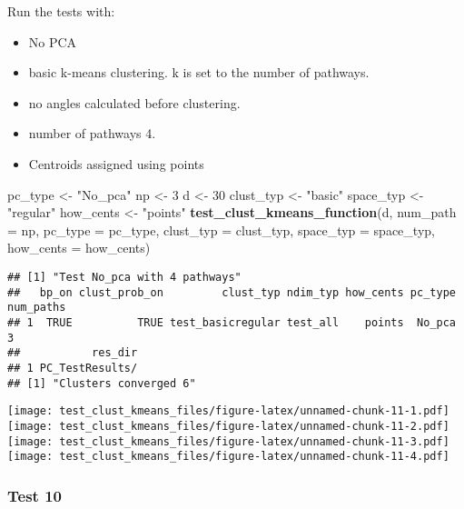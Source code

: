 \documentclass[
]{article}
\newenvironment{Shaded}{\begin{snugshade}}{\end{snugshade}}
\newcommand{\AttributeTok}[1]{\textcolor[rgb]{0.13,0.29,0.53}{#1}}
\newcommand{\DecValTok}[1]{\textcolor[rgb]{0.00,0.00,0.81}{#1}}
\newcommand{\FunctionTok}[1]{\textcolor[rgb]{0.13,0.29,0.53}{\textbf{#1}}}
\newcommand{\NormalTok}[1]{#1}
\newcommand{\OtherTok}[1]{\textcolor[rgb]{0.56,0.35,0.01}{#1}}
\newcommand{\StringTok}[1]{\textcolor[rgb]{0.31,0.60,0.02}{#1}}
\providecommand{\tightlist}{%
  \setlength{\itemsep}{0pt}\setlength{\parskip}{0pt}}
\begin{document}
Run the tests with:

\begin{itemize}
\tightlist
\item
  No PCA
\item
  basic k-means clustering. k is set to the number of pathways.
\item
  no angles calculated before clustering.
\item
  number of pathways 4.
\item
  Centroids assigned using points
\end{itemize}

\begin{Shaded}
\begin{Highlighting}[]
\NormalTok{pc\_type }\OtherTok{\textless{}{-}} \StringTok{"No\_pca"}
\NormalTok{np }\OtherTok{\textless{}{-}} \DecValTok{3}
\NormalTok{d }\OtherTok{\textless{}{-}} \DecValTok{30}
\NormalTok{clust\_typ }\OtherTok{\textless{}{-}} \StringTok{"basic"}
\NormalTok{space\_typ }\OtherTok{\textless{}{-}} \StringTok{"regular"}
\NormalTok{how\_cents }\OtherTok{\textless{}{-}} \StringTok{"points"}
\FunctionTok{test\_clust\_kmeans\_function}\NormalTok{(d,}
                           \AttributeTok{num\_path =}\NormalTok{ np,}
                           \AttributeTok{pc\_type =}\NormalTok{ pc\_type,}
                           \AttributeTok{clust\_typ =}\NormalTok{ clust\_typ,}
                           \AttributeTok{space\_typ =}\NormalTok{ space\_typ,}
                           \AttributeTok{how\_cents =}\NormalTok{ how\_cents)}
\end{Highlighting}
\end{Shaded}

\begin{verbatim}
## [1] "Test No_pca with 4 pathways"
##   bp_on clust_prob_on         clust_typ ndim_typ how_cents pc_type num_paths
## 1  TRUE          TRUE test_basicregular test_all    points  No_pca         3
##           res_dir
## 1 PC_TestResults/
## [1] "Clusters converged 6"
\end{verbatim}

\texttt{[image: test\_clust\_kmeans\_files/figure-latex/unnamed-chunk-11-1.pdf]}
\texttt{[image: test\_clust\_kmeans\_files/figure-latex/unnamed-chunk-11-2.pdf]}
\texttt{[image: test\_clust\_kmeans\_files/figure-latex/unnamed-chunk-11-3.pdf]}
\texttt{[image: test\_clust\_kmeans\_files/figure-latex/unnamed-chunk-11-4.pdf]}

\hypertarget{test-10}{%
\subsubsection{Test 10}\label{test-10}}
\end{document}
